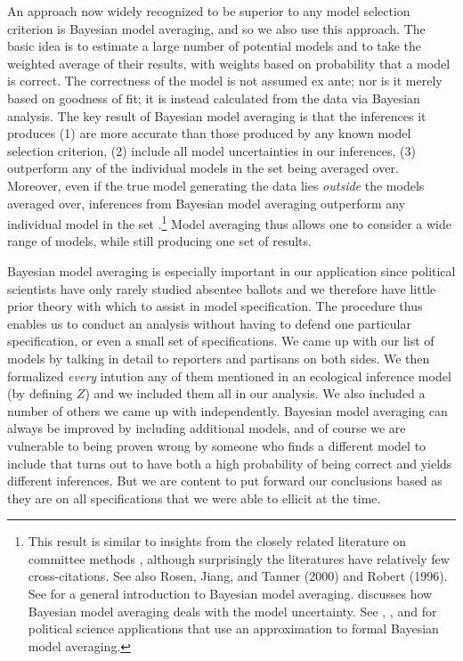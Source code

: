 \documentclass[11pt,titlepage]{article}
\begin{document}
An approach now widely recognized to be superior to any model
selection criterion is Bayesian model averaging, and so we also use
this approach.  The basic idea is to estimate a large number of
potential models and to take the weighted average of their results,
with weights based on probability that a model is correct.  The
correctness of the model is not assumed ex ante; nor is it merely
based on goodness of fit; it is instead calculated from the data via
Bayesian analysis.  The key result of Bayesian model averaging is that
the inferences it produces (1) are more accurate than those produced
by any known model selection criterion, (2) include all model
uncertainties in our inferences, (3) outperform any of the individual
models in the set being averaged over.  Moreover, even if the true
model generating the data lies \emph{outside} the models averaged
over, inferences from Bayesian model averaging outperform any
individual model in the set \citep{madi:raft:94}.\footnote{This result
  is similar to insights from the closely related literature on
  committee methods \citep{bish:95}, although surprisingly the
  literatures have relatively few cross-citations.  See also Rosen,
  Jiang, and Tanner (2000) and Robert
  (1996)\nocite{rose:jian:tann:00,robe:96a}.  See
  \citet{hoet:madi:raft:voli:99} for a general introduction to
  Bayesian model averaging.  \citet{drap:95} discusses how Bayesian
  model averaging deals with the model uncertainty.  See
  \citet{bart:97}, \citet{BarZal01}, and \citet{EriBafWil02} for
  political science applications that use an approximation to formal
  Bayesian model averaging.} Model averaging thus allows one to
consider a wide range of models, while still producing one set of
results.

Bayesian model averaging is especially important in our application
since political scientists have only rarely studied absentee ballots
and we therefore have little prior theory with which to assist in
model specification.  The procedure thus enables us to conduct an
analysis without having to defend one particular specification, or
even a small set of specifications.  We came up with our list of
models by talking in detail to reporters and partisans on both sides.
We then formalized \emph{every} intution any of them mentioned in an
ecological inference model (by defining $Z$) and we included them all
in our analysis.  We also included a number of others we came up with
independently.  Bayesian model averaging can always be improved by
including additional models, and of course we are vulnerable to being
proven wrong by someone who finds a different model to include that
turns out to have both a high probability of being correct and yields
different inferences.  But we are content to put forward our
conclusions based as they are on all specifications that we were able
to ellicit at the time.
\end{document}
